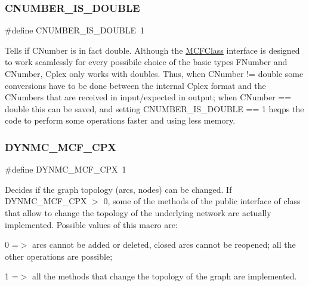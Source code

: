 \subsubsection{\texorpdfstring{C\+N\+U\+M\+B\+E\+R\+\_\+\+I\+S\+\_\+\+D\+O\+U\+B\+LE}{CNUMBER\_IS\_DOUBLE}}
{\footnotesize\ttfamily \#define C\+N\+U\+M\+B\+E\+R\+\_\+\+I\+S\+\_\+\+D\+O\+U\+B\+LE~1}

Tells if C\+Number is in fact double. Although the \mbox{\hyperlink{class_m_c_f_class}{M\+C\+F\+Class}} interface is designed to work seamlessly for every possibile choice of the basic types F\+Number and C\+Number, Cplex only works with doubles. Thus, when C\+Number != double some conversions have to be done between the internal Cplex format and the C\+Numbers that are received in input/expected in output; when C\+Number == double this can be saved, and setting C\+N\+U\+M\+B\+E\+R\+\_\+\+I\+S\+\_\+\+D\+O\+U\+B\+LE == 1 heqps the code to perform some operations faster and using less memory. \mbox{\label{group___m_c_f_c_p_l_e_x___m_a_c_r_o_s_gaec7c2e23803c5fa391ff6b13ecac23b6}} 
\subsubsection{\texorpdfstring{D\+Y\+N\+M\+C\+\_\+\+M\+C\+F\+\_\+\+C\+PX}{DYNMC\_MCF\_CPX}}
{\footnotesize\ttfamily \#define D\+Y\+N\+M\+C\+\_\+\+M\+C\+F\+\_\+\+C\+PX~1}

Decides if the graph topology (arcs, nodes) can be changed. If D\+Y\+N\+M\+C\+\_\+\+M\+C\+F\+\_\+\+C\+PX $>$ 0, some of the methods of the public interface of class that allow to change the topology of the underlying network are actually implemented. Possible values of this macro are\+:


\begin{DoxyItemize}
\item 0 =$>$ arcs cannot be added or deleted, closed arcs cannot be reopened; all the other operations are possible;
\item 1 =$>$ all the methods that change the topology of the graph are implemented. 
\end{DoxyItemize}\mbox{\label{group___m_c_f_c_p_l_e_x___m_a_c_r_o_s_ga8d69259915b94276655a8693f449afd9}} 
